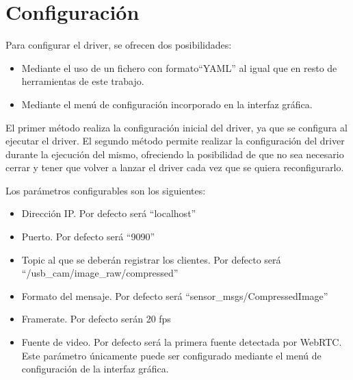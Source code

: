 \section{Configuración}
Para configurar el driver, se ofrecen dos posibilidades:
\begin{itemize}
\item Mediante el uso de un fichero con formato``YAML'' al igual que en resto de herramientas de este trabajo. 
\item Mediante el menú de configuración incorporado en la interfaz gráfica.
\end{itemize}
El primer método realiza la configuración inicial del driver, ya que se configura al ejecutar el driver. El segundo método permite realizar la configuración del driver durante la ejecución del mismo, ofreciendo la posibilidad de que no sea necesario cerrar y tener que volver a lanzar el driver cada vez que se quiera reconfigurarlo.

Los parámetros configurables son los siguientes:
\begin{itemize}
\item Dirección IP. Por defecto será ``localhost''
\item Puerto. Por defecto será ``9090''
\item Topic al que se deberán registrar los clientes. Por defecto será ``/usb\_cam/image\_raw/compressed''
\item Formato del mensaje. Por defecto será ``sensor\_msgs/CompressedImage''
\item Framerate. Por defecto serán 20 fps
\item Fuente de video. Por defecto será la primera fuente detectada por WebRTC. Este parámetro únicamente puede ser configurado mediante el menú de configuración de la interfaz gráfica.
\end{itemize}

